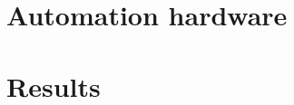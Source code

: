 \documentclass[utf8]{frontiersSCNS}
\begin{document}

\section{Automation hardware}

\section{Results}
\end{document}
